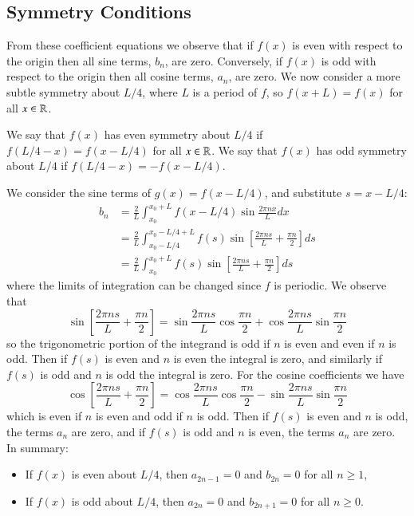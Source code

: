 \documentclass[12pt, a4paper, oneside, openright, titlepage]{book}
\begin{document}
\subsection{Symmetry Conditions}

From these coefficient equations we observe that if $f(x)$ is even with respect to the origin then all sine terms, $b_n$, are zero. Conversely, if $f(x)$ is odd with respect to the origin then all cosine terms, $a_n$, are zero. We now consider a more subtle symmetry about $L/4$, where $L$ is a period of $f$, so $f(x+L) = f(x)$ for all $x \in \mathbb R$.

\begin{defn}
    We say that $f(x)$ has even symmetry about $L/4$ if $f(L/4-x) = f(x-L/4)$ for all $x \in \mathbb R$. We say that $f(x)$ has odd symmetry about $L/4$ if $f(L/4-x) = -f(x-L/4)$.
\end{defn}

We consider the sine terms of $g(x) = f(x-L/4)$, and substitute $s = x-L/4$: \begin{align*}
    b_n &= \frac{2}{L}\int_{x_0}^{x_0+L}f(x-L/4)\sin\frac{2\pi nx}{L}dx \\
    &= \frac{2}{L}\int_{x_0-L/4}^{x_0-L/4+L}f(s)\sin\left[\frac{2\pi ns}{L} + \frac{\pi n}{2}\right]ds \\
    &= \frac{2}{L}\int_{x_0}^{x_0+L}f(s)\sin\left[\frac{2\pi ns}{L} + \frac{\pi n}{2}\right]ds
\end{align*}
where the limits of integration can be changed since $f$ is periodic. We observe that \begin{equation*}
    \sin\left[\frac{2\pi ns}{L} + \frac{\pi n}{2}\right] = \sin\frac{2\pi ns}{L}\cos\frac{\pi n}{2}+\cos\frac{2\pi ns}{L}\sin\frac{\pi n}{2}
\end{equation*}
so the trigonometric portion of the integrand is odd if $n$ is even and even if $n$ is odd. Then if $f(s)$ is even and $n$ is even the integral is zero, and similarly if $f(s)$ is odd and $n$ is odd the integral is zero. For the cosine coefficients we have \begin{equation*}
    \cos\left[\frac{2\pi ns}{L} + \frac{\pi n}{2}\right] = \cos\frac{2\pi ns}{L}\cos\frac{\pi n}{2}-\sin\frac{2\pi ns}{L}\sin\frac{\pi n}{2}
\end{equation*}
which is even if $n$ is even and odd if $n$ is odd. Then if $f(s)$ is even and $n$ is odd, the terms $a_n$ are zero, and if $f(s)$ is odd and $n$ is even, the terms $a_n$ are zero. In summary: \begin{itemize}
    \item If $f(x)$ is even about $L/4$, then $a_{2n-1} = 0$ and $b_{2n} = 0$ for all $n \geq 1$,
    \item If $f(x)$ is odd about $L/4$, then $a_{2n} = 0$ and $b_{2n+1} = 0$ for all $n \geq 0$.
\end{itemize}
\end{document}
